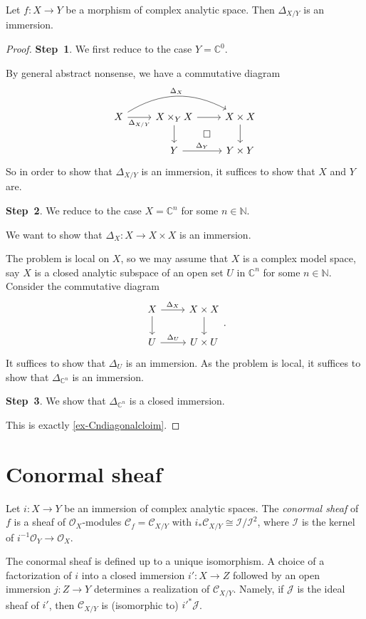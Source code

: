 \begin{proposition}\label{prop-diagoimm}
    Let $f:X\rightarrow Y$ be a morphism of complex analytic space. Then $\Delta_{X/Y}$ is an immersion.
\end{proposition}
\begin{proof}
    \textbf{Step~1}.    We first reduce to the case $Y=\mathbb{C}^0$.

    By general abstract nonsense, we have a commutative diagram
    \[
        \begin{tikzcd}
            X \arrow[r, "\Delta_{X/Y}"'] \arrow[rr, "\Delta_X", bend left] & X\times_Y X \arrow[d] \arrow[r] \arrow[rd, "\square", phantom] & X\times X \arrow[d] \\
                                                                           & Y \arrow[r, "\Delta_Y"]                                        & Y\times Y          
        \end{tikzcd}  
    \]
    So in order to show that $\Delta_{X/Y}$ is an immersion, it suffices to show that $X$ and $Y$ are.

    \textbf{Step~2}. We reduce to the case $X=\mathbb{C}^n$ for some $n\in \mathbb{N}$.
    
    We want to show that $\Delta_X:X\rightarrow X\times X$ is an immersion.

    The problem is local on $X$, so we may assume that $X$ is a complex model space, say $X$ is a closed analytic subspace of an open set $U$ in $\mathbb{C}^n$ for some $n\in \mathbb{N}$.
    Consider the commutative diagram
    \[
        \begin{tikzcd}
            X \arrow[r, "\Delta_X"] \arrow[d] & X\times X \arrow[d] \\
            U \arrow[r, "\Delta_U"]           & U\times U          
        \end{tikzcd}.  
    \]
    It suffices to show that $\Delta_U$ is an immersion. 
    As the problem is local, it suffices to show that $\Delta_{\mathbb{C}^n}$ is an immersion.

    \textbf{Step~3}. We show that $\Delta_{\mathbb{C}^n}$ is a closed immersion.

    This is exactly \cref{ex-Cndiagonalcloim}.
\end{proof}


\section{Conormal sheaf}
\begin{definition}
    Let $i:X\rightarrow Y$ be an immersion of complex analytic spaces. The \emph{conormal sheaf} of $f$ is a sheaf of $\mathcal{O}_X$-modules $\mathcal{C}_f=\mathcal{C}_{X/Y}$ with $i_*\mathcal{C}_{X/Y}\cong \mathcal{I}/\mathcal{I}^2$, where $\mathcal{I}$ is the kernel of $i^{-1}\mathcal{O}_Y\rightarrow \mathcal{O}_X$.
\end{definition}
The conormal sheaf is defined up to a unique isomorphism. A choice of a factorization of $i$ into a closed immersion $i':X\rightarrow Z$ followed by an open immersion $j:Z\rightarrow Y$ determines a realization of $\mathcal{C}_{X/Y}$. Namely, if $\mathcal{J}$ is the ideal sheaf of $i'$, then $\mathcal{C}_{X/Y}$ is (isomorphic to) $i'^{*}\mathcal{J}$.

